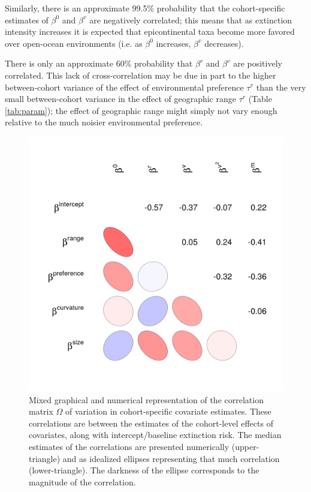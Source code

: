 \documentclass[11pt]{article}
\begin{document}
Similarly, there is an approximate 99.5\% probability that the cohort-specific estimates of \(\beta^{0}\) and \(\beta^{v}\) are negatively correlated; this means that as extinction intensity increases it is expected that epicontinental taxa become more favored over open-ocean environments (i.e. as \(\beta^{0}\) increases, \(\beta^{v}\) decreases). 

There is only an approximate 60\% probability that \(\beta^{r}\) and \(\beta^{v}\) are positively correlated. This lack of cross-correlation may be due in part to the higher between-cohort variance of the effect of environmental preference \(\tau^{v}\) than the very small between-cohort variance in the effect of geographic range \(\tau^{r}\) (Table \ref{tab:param}); the effect of geographic range might simply not vary enough relative to the much noisier environmental preference.

\begin{figure}[ht]
  \centering
  \includegraphics[height = 0.8\textheight,width=\textwidth,keepaspectratio=true]{figure/wei_cor_heatmap_cweib_cens}
  \caption{Mixed graphical and numerical representation of the correlation matrix \(\Omega\) of variation in cohort-specific covariate estimates. These correlations are between the estimates of the cohort-level effects of covariates, along with intercept/baseline extinction risk. The median estimates of the correlations are presented numerically (upper-triangle) and as idealized ellipses representing that much correlation (lower-triangle). The darkness of the ellipse corresponds to the magnitude of the correlation.}
  \label{fig:cor_posterior}
\end{figure}
\end{document}
